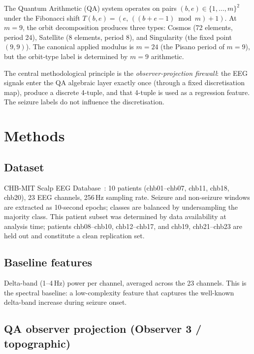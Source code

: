 \documentclass[11pt]{article}
\begin{document}
The Quantum Arithmetic (QA) system operates on pairs $(b,e) \in \{1,\dots,m\}^2$
under the Fibonacci shift $T(b,e) = (e,\, ((b+e-1)\bmod m)+1)$.
At $m=9$, the orbit decomposition produces three types:
Cosmos (72 elements, period 24), Satellite (8 elements, period 8), and
Singularity (the fixed point $(9,9)$).
The canonical applied modulus is $m=24$ (the Pisano period of $m=9$),
but the orbit-type label is determined by $m=9$ arithmetic.

The central methodological principle is the \emph{observer-projection firewall}:
the EEG signals enter the QA algebraic layer exactly once (through a fixed
discretisation map), produce a discrete 4-tuple, and that 4-tuple is used
as a regression feature.  The seizure labels do not influence the discretisation.

\section{Methods}\label{sec:methods}

\subsection{Dataset}

CHB-MIT Scalp EEG Database~\cite{chbmit}: 10 patients
(chb01--chb07, chb11, chb18, chb20),
23 EEG channels, 256\,Hz sampling rate.  Seizure and non-seizure windows
are extracted as 10-second epochs; classes are balanced by undersampling
the majority class.  This patient subset was determined by data availability
at analysis time; patients chb08--chb10, chb12--chb17, and chb19, chb21--chb23
are held out and constitute a clean replication set.

\subsection{Baseline features}

Delta-band (1--4\,Hz) power per channel, averaged across the 23 channels.
This is the spectral baseline: a low-complexity feature that captures the
well-known delta-band increase during seizure onset.

\subsection{QA observer projection (Observer 3 / topographic)}
\end{document}
